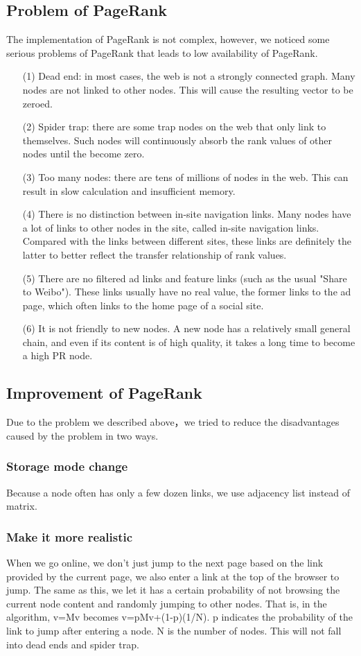 \documentclass{acmtog} %
\begin{document}
\subsection{Problem of PageRank}
The implementation of PageRank is not complex, however, we noticed some serious problems of PageRank that leads to low availability of PageRank.
\begin{enumerate}
    \item [(1)]Dead end: in most cases, the web is not a strongly connected graph. Many nodes are not linked to other nodes. This will cause the resulting vector to be zeroed.
    \item [(2)] Spider trap: there are some trap nodes on the web that only link to themselves. Such nodes will continuously absorb the rank values of other nodes until the become zero.
    \item [(3)] Too many nodes: there are tens of millions of nodes in the web. This can result in slow calculation and insufficient memory.
    \item [(4)] There is no distinction between in-site navigation links. Many nodes have a lot of links to other nodes in the site, called in-site navigation links. Compared with the links between different sites, these links are definitely the latter to better reflect the transfer relationship of rank values.
    \item [(5)]There are no filtered ad links and feature links (such as the usual "Share to Weibo"). These links usually have no real value, the former links to the ad page, which often links to the home page of a social site.
    \item [(6)]It is not friendly to new nodes. A new node has a relatively small general chain, and even if its content is of high quality, it takes a long time to become a high PR node.
\end{enumerate}
\subsection{Improvement of PageRank}
Due to the problem we described above，we tried to reduce the disadvantages caused by the problem in two ways.
\subsubsection{Storage mode change}
 Because a node often has only a few dozen links, we use adjacency list instead of matrix.
 \subsubsection{Make it more realistic}
 When we go online, we don't just jump to the next page based on the link provided by the current page, we also enter a link at the top of the browser to jump. The same as this, we let it has a certain probability of not browsing the current node content and randomly jumping to other nodes. That is, in the algorithm, v=Mv becomes v=pMv+(1-p)(1/N). p indicates the probability of the link to jump after entering a node. N is the number of nodes. This will not fall into dead ends and spider trap.
\end{document}
